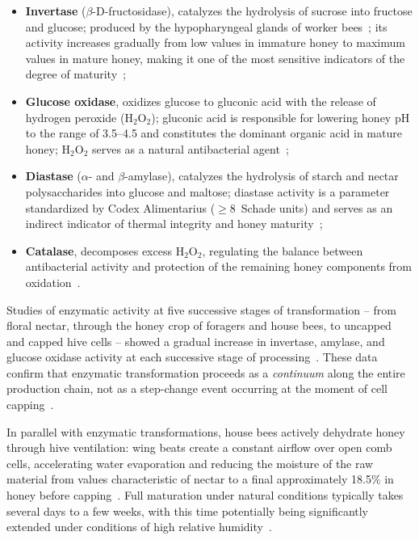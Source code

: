 \begin{itemize}
    \item \textbf{Invertase} ($\beta$-D-fructosidase), catalyzes
          the hydrolysis of sucrose into fructose and glucose;
          produced by the hypopharyngeal glands of worker
          bees~\cite{biochemreactions2022};
          its activity increases gradually from low values
          in immature honey to maximum values in mature honey,
          making it one of the most sensitive indicators of
          the degree of maturity~\cite{zhang2021};
    \item \textbf{Glucose oxidase}, oxidizes glucose to gluconic
          acid with the release of hydrogen peroxide (H$_2$O$_2$);
          gluconic acid is responsible for lowering honey pH to the
          range of 3.5--4.5 and constitutes the dominant organic
          acid in mature honey; H$_2$O$_2$ serves as a natural
          antibacterial agent~\cite{biochemreactions2022,zhang2021};
    \item \textbf{Diastase} ($\alpha$- and $\beta$-amylase),
          catalyzes the hydrolysis of starch and nectar
          polysaccharides into glucose and maltose; diastase
          activity is a parameter standardized by Codex Alimentarius
          ($\geq 8$~Schade units) and serves as an indirect indicator
          of thermal integrity and honey
          maturity~\cite{codex_stan12,biochemreactions2022,zhang2021};
    \item \textbf{Catalase}, decomposes excess H$_2$O$_2$,
          regulating the balance between antibacterial activity
          and protection of the remaining honey components
          from oxidation~\cite{biochemreactions2022}.
\end{itemize}

Studies of enzymatic activity at five successive stages of
transformation -- from floral nectar, through the honey crop of
foragers and house bees, to uncapped and capped hive cells -- showed
a gradual increase in invertase, amylase, and glucose oxidase
activity at each successive stage of
processing~\cite{enzymesrole2023}. These data confirm that
enzymatic transformation proceeds as a \emph{continuum} along
the entire production chain, not as a step-change event occurring
at the moment of cell capping~\cite{enzymesrole2023,zhang2021}.

In parallel with enzymatic transformations, house bees actively
dehydrate honey through hive ventilation: wing beats create a
constant airflow over open comb cells, accelerating water
evaporation and reducing the moisture of the raw material from
values characteristic of nectar to a final approximately 18.5\%
in honey before capping~\cite{zhang2021}. Full maturation under
natural conditions typically takes several days to a few weeks,
with this time potentially being significantly extended under
conditions of high relative
humidity~\cite{zhang2021,tadele2025}.


